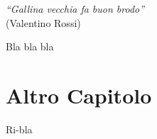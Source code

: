 \documentclass[a4paper,12pt,openright,twoside,titlepage]{book}
\newcommand{\fncyblank}{\fancyhf{}}
\newenvironment{abstract}%
{\cleardoublepage\fncyblank\null\vfill\begin{center}%
	\bfseries\abstractname\end{center}}%
{\vfill\null}
\begin{document}
\thispagestyle{empty}

\begin{titlepage}
	\thispagestyle{empty}
	\begin{flushright}
		\vspace*{40 mm}
		\small{\emph{``Gallina vecchia fa buon brodo''}\\(Valentino Rossi)}
	\end{flushright}	
	\vfill
\end{titlepage}
\thispagestyle{empty}

\begin{titlepage}
	\begin{abstract}
		Bla bla bla
	\end{abstract}
	\vfill
\end{titlepage}
\thispagestyle{empty}

\frontmatter
\tableofcontents
\mainmatter




\chapter{Altro Capitolo}
Ri-bla \cite{einstein}



\printbibliography[heading=bibintoc, title=Bibliografia]


\end{document}
